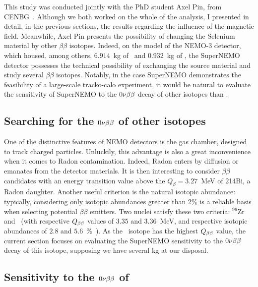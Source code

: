 This study was conducted jointly with the PhD student Axel Pin, from CENBG~\cite{AxelThesis}.
Although we both worked on the whole of the analysis, I presented in detail, in the previous sections, the results regarding the influence of the magnetic field.
Meanwhile, Axel Pin presents the possibility of changing the Selenium material by other $\beta\beta$ isotopes.
Indeed, on the model of the NEMO-$3$ detector, which housed, among others, $6.914$~kg of \Mo\ and $0.932$~kg of \Se, the SuperNEMO detector possesses the technical possibility of exchanging the source material and study several $\beta\beta$ isotopes.
Notably, in the case SuperNEMO demonstrates the feasibility of a large-scale tracko-calo experiment, it would be natural to  evaluate the sensitivity of SuperNEMO to the $0\nu\beta\beta$ decay of other isotopes than \Se.

\subsection{Searching for the $0\nu\beta\beta$ of other isotopes}

One of the distinctive features of NEMO detectors is the gas chamber, designed to track charged particles.
Unluckily, this advantage is also a great inconvenience when it comes to Radon contamination.
Indeed, Radon enters by diffusion or emanates from the detector materials.
It is then interesting to consider $\beta\beta$ candidates with an energy transition value above the $Q_{\beta}=3.27$~MeV of 214Bi, a Radon daughter.
Another useful criterion is the natural isotopic abundance: typically, considering only isotopic abundances greater than 2\% is a reliable basis when selecting potential $\beta\beta$ emitters.
Two nuclei satisfy these two criteria: $^{96}$Zr and \Nd\ (with respective $Q_{\beta\beta}$ values of $3.35$ and $3.36$~MeV, and respective isotopic abundances of $2.8$ and $5.6$~\%~\cite{art:atomic_mass}).
As the \Nd\ isotope has the highest $Q_{\beta\beta}$ value, the current section focuses on evaluating the SuperNEMO sensitivity to the $0\nu\beta\beta$ decay of this isotope, supposing we have several kg at our disposal.

\subsection{Sensitivity to the $0\nu\beta\beta$ of \Nd}


